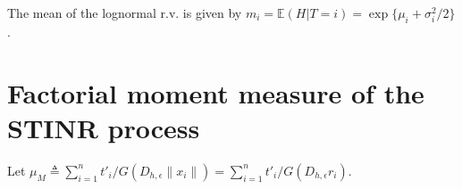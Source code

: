 \documentclass[lettersize,journal]{IEEEtran}
\begin{document}
The mean of the lognormal r.v. is given by $ m_i=\mathbb{E}(H|T=i) = \exp \{\mu_i+\sigma_i^2/2\}$.




\appendices

\section{Factorial moment measure of the STINR process}
Let $\mu_M \triangleq \sum_{i=1}^nt'_i/G(D_{h,\epsilon}\|x_i\|)=\sum_{i=1}^nt'_i/G(D_{h,\epsilon} r_i)$.
\end{document}

